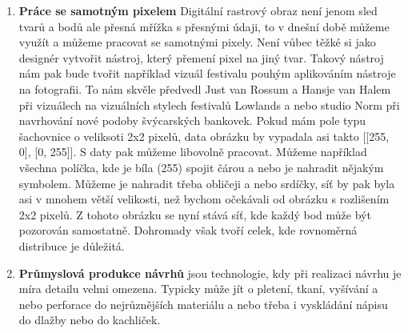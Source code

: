 \documentclass[a4paper]{article}
\begin{document}
\begin{enumerate}
\begin{enumerate}
\item \textbf{Práce se samotným pixelem}
Digitální rastrový obraz není jenom sled tvarů a bodů ale přesná mřížka s přesnými údaji, to v dnešní době můžeme využít a můžeme pracovat se samotnými pixely. Není vůbec těžké si jako designér vytvořit nástroj, který přemení pixel na jiný tvar. Takový nástroj nám pak bude tvořit například vizuál festivalu pouhým aplikováním nástroje na fotografii. To nám skvěle předvedl Just van Rossum a Hansje van Halem při vizuálech na vizuálních stylech festivalů Lowlands a nebo studio Norm při navrhování nové podoby švýcarských bankovek. Pokud mám pole typu šachovnice o veliksoti 2x2 pixelů, data obrázku by vypadala asi takto [[255, 0], [0, 255]]. S daty pak můžeme libovolně pracovat. Můžeme například všechna políčka, kde je bíla (255) spojit čárou a nebo je nahradit nějakým symbolem. Můžeme je nahradit třeba obličeji a nebo srdíčky, síť by pak byla asi v mnohem větší velikosti, než bychom očekávali od obrázku s rozlišením 2x2 pixelů. Z tohoto obrázku se nyní stává síť, kde každý bod může být pozorován samostatně. Dohromady však tvoří celek, kde rovnoměrná distribuce je důležitá.

\item \textbf{Průmyslová produkce návrhů}
jsou technologie, kdy při realizaci návrhu je míra detailu velmi omezena. Typicky může jít o pletení, tkaní, vyšívání a nebo perforace do nejrůznějších materiálu a nebo třeba i vyskládání nápisu do dlažby nebo do kachliček.
\end{enumerate}


\end{enumerate}
\end{document}
